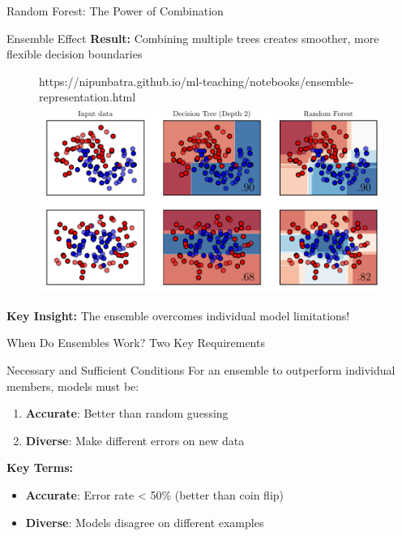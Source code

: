 \documentclass[8pt]{beamer}
\newcommand{\fitpic}[1]{\begin{adjustbox}{max width=\linewidth, max totalheight=0.78\textheight}#1\end{adjustbox}}
\begin{document}
\begin{frame}{Random Forest: The Power of Combination}
\begin{examplebox}{Ensemble Effect}
\textbf{Result:} Combining multiple trees creates smoother, more flexible decision boundaries
\end{examplebox}

  \begin{figure}[htp]
    \centering
    \begin{notebookbox}{https://nipunbatra.github.io/ml-teaching/notebooks/ensemble-representation.html}
      \fitpic{\includegraphics[scale=0.6]{../assets/ensemble/figures/2-representation.pdf}}
    \end{notebookbox}
  \end{figure}
  
\begin{keypointsbox}
\textbf{Key Insight:} The ensemble overcomes individual model limitations!
\end{keypointsbox}
  \end{frame}




\begin{frame}{When Do Ensembles Work? Two Key Requirements}
\begin{definitionbox}{Necessary and Sufficient Conditions}
For an ensemble to outperform individual members, models must be:
\begin{enumerate}
\item \textbf{Accurate}: Better than random guessing
\item \textbf{Diverse}: Make different errors on new data
\end{enumerate}
\end{definitionbox}

\begin{keypointsbox}
\textbf{Key Terms:}
\begin{itemize}
\item \textbf{Accurate}: Error rate < 50\% (better than coin flip)
\item \textbf{Diverse}: Models disagree on different examples
\end{itemize}
\end{keypointsbox}
\end{frame}
\end{document}
